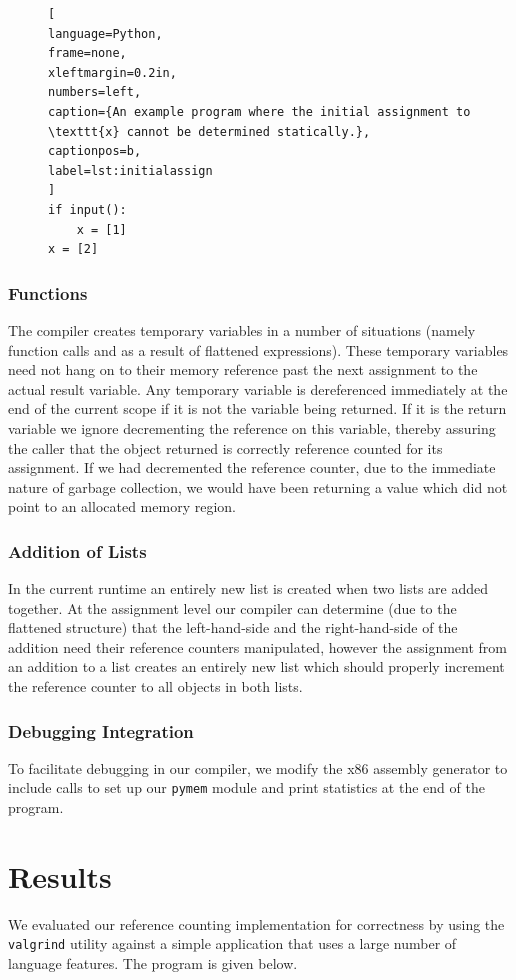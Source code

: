 \documentclass{sigplanconf}
\begin{document}
\begin{figure}[h!]
\begin{lstlisting}[
language=Python,
frame=none,
xleftmargin=0.2in,
numbers=left,
caption={An example program where the initial assignment to \texttt{x} cannot be determined statically.},
captionpos=b,
label=lst:initialassign
]
if input():
    x = [1]
x = [2]
\end{lstlisting}
\end{figure}


\subsubsection{Functions}
The compiler creates temporary variables in a number of situations (namely function calls and as a result of flattened expressions).  These temporary variables need not hang on to their memory reference past the next assignment to the actual result variable.  Any temporary variable is dereferenced immediately at the end of the current scope if it is not the variable being returned.  If it is the return variable we ignore decrementing the reference on this variable, thereby assuring the caller that the object returned is correctly reference counted for its assignment.  If we had decremented the reference counter, due to the immediate nature of garbage collection, we would have been returning a value which did not point to an allocated memory region.

\subsubsection{Addition of Lists}
In the current runtime an entirely new list is created when two lists are added together.  At the assignment level our compiler can determine (due to the flattened structure) that the left-hand-side and the right-hand-side of the addition need their reference counters manipulated, however the assignment from an addition to a list creates an entirely new list which should properly increment the reference counter to all objects in both lists.

\subsubsection{Debugging Integration}
To facilitate debugging in our compiler, we modify the x86 assembly generator to include calls to set up our \texttt{pymem} module and print statistics at the end of the program.

\section{Results}
\label{sec:results}
We evaluated our reference counting implementation for correctness by using the \texttt{valgrind} utility against a simple application that uses a large number of language features.  The program is given below.
\end{document}

